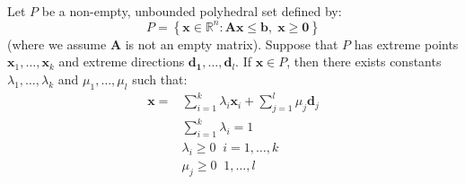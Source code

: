 \begin{theorem} Let $P$ be a non-empty, unbounded polyhedral set defined by:
\begin{displaymath}
P = \left\{\mathbf{x} \in \mathbb{R}^n : \mathbf{A} \mathbf{x} \leq \mathbf{b},\;\mathbf{x} \geq \mathbf{0}\right\}
\end{displaymath}
(where we assume $\mathbf{A}$ is not an empty matrix). Suppose that $P$ has extreme points $\mathbf{x}_1,\dots,\mathbf{x}_k$ and extreme directions $\mathbf{d_1},\dots,\mathbf{d}_l$. If $\mathbf{x} \in P$, then there exists constants $\lambda_1,\dots,\lambda_k$ and $\mu_1,\dots,\mu_l$
such that:
\begin{equation}
\begin{aligned}
\mathbf{x} = &\sum_{i=1}^{k}\lambda_i\mathbf{x}_i + \sum_{j=1}^{l}\mu_j\mathbf{d}_j\\
&\sum_{i=1}^k \lambda_i = 1\\
&\lambda_i \geq 0\;\;i=1,\dots,k\\
&\mu_j \geq 0\;\;1,\dots,l
\end{aligned}
\label{eqn:Representation}
\end{equation}
\end{theorem}
